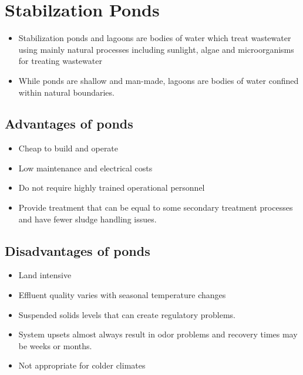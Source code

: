 



\chapter{Stabilzation Ponds}

\begin{itemize}
\item Stabilization ponds and lagoons are bodies of water which treat wastewater using mainly natural processes including sunlight, algae and microorganisms for treating wastewater\\
\item While ponds are shallow and man-made, lagoons are bodies of water confined within natural boundaries.\\
\end{itemize}


\section{Advantages of ponds}	

\begin{itemize}	
\item Cheap to build and operate
\item Low maintenance and electrical costs
\item Do not require highly trained operational personnel
\item Provide treatment that can be equal to some secondary treatment processes and have fewer sludge handling issues.\\
\end{itemize}


\section{Disadvantages of ponds}	
\begin{itemize}	
\item Land intensive
\item Effluent quality varies with seasonal temperature changes
\item Suspended solids levels that can create regulatory problems.
\item System upsets almost always result in odor problems and recovery times may be weeks or months.
\item Not appropriate for colder climates
\end{itemize} 

